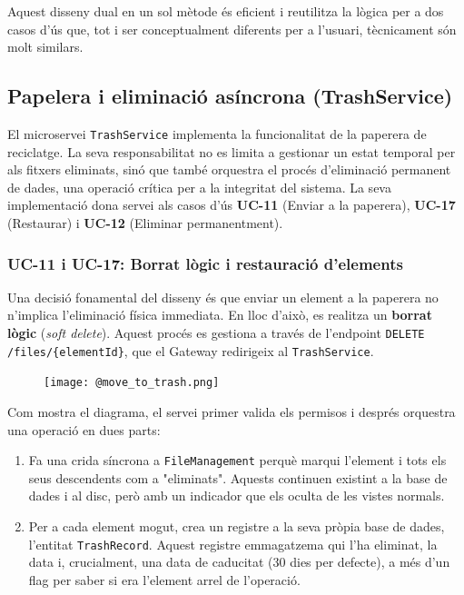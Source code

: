 Aquest disseny dual en un sol mètode és eficient i reutilitza la lògica per a dos casos d'ús que, tot i ser conceptualment diferents per a l'usuari, tècnicament són molt similars.

\subsection{Papelera i eliminació asíncrona (TrashService)}

El microservei \texttt{TrashService} implementa la funcionalitat de la paperera de reciclatge. La seva responsabilitat no es limita a gestionar un estat temporal per als fitxers eliminats, sinó que també orquestra el procés d'eliminació permanent de dades, una operació crítica per a la integritat del sistema. La seva implementació dona servei als casos d'ús \textbf{UC-11} (Enviar a la paperera), \textbf{UC-17} (Restaurar) i \textbf{UC-12} (Eliminar permanentment).

\subsubsection{UC-11 i UC-17: Borrat lògic i restauració d'elements}

Una decisió fonamental del disseny és que enviar un element a la paperera no n'implica l'eliminació física immediata. En lloc d'això, es realitza un \textbf{borrat lògic} (\textit{soft delete}). Aquest procés es gestiona a través de l'endpoint \texttt{DELETE /files/\{elementId\}}, que el Gateway redirigeix al \texttt{TrashService}.

\begin{figure}[H]
    \centering
    \texttt{[image: @move\_to\_trash.png]}
\end{figure}

Com mostra el diagrama, el servei primer valida els permisos i després orquestra una operació en dues parts:
\begin{enumerate}
    \item Fa una crida síncrona a \texttt{FileManagement} perquè marqui l'element i tots els seus descendents com a "eliminats". Aquests continuen existint a la base de dades i al disc, però amb un indicador que els oculta de les vistes normals.
    \item Per a cada element mogut, crea un registre a la seva pròpia base de dades, l'entitat \texttt{TrashRecord}. Aquest registre emmagatzema qui l'ha eliminat, la data i, crucialment, una data de caducitat (30 dies per defecte), a més d'un flag per saber si era l'element arrel de l'operació.
\end{enumerate}

